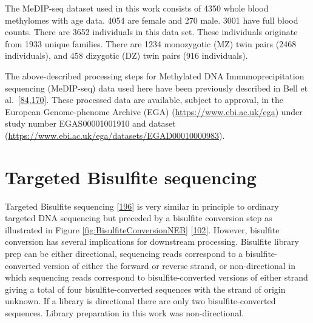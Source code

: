 \documentclass[
]{book}
\begin{document}
The MeDIP-seq dataset used in this work consists of 4350 whole blood methylomes with age data.
4054 are female and 270 male.
3001 have full blood counts.
There are 3652 individuals in this data set.
These individuals originate from 1933 unique families.
There are 1234 monozygotic (MZ) twin pairs (2468 individuals), and 458 dizygotic (DZ) twin pairs (916 individuals).

The above-described processing steps for Methylated DNA Immunoprecipitation sequencing (MeDIP-seq) data used here have been previously described in Bell et al.~{[}\protect\hyperlink{ref-Bell2017a}{84},\protect\hyperlink{ref-Bell2016}{170}{]}.
These processed data are available, subject to approval, in the European Genome-phenome Archive (EGA) (\url{https://www.ebi.ac.uk/ega}) under study number EGAS00001001910 and dataset (\url{https://www.ebi.ac.uk/ega/datasets/EGAD00010000983}).

\hypertarget{targeted-bisulfite-sequencing}{%
\section{Targeted Bisulfite sequencing}\label{targeted-bisulfite-sequencing}}

Targeted Bisulfite sequencing {[}\protect\hyperlink{ref-Korbie2015}{196}{]} is very similar in principle to ordinary targeted DNA sequencing but preceded by a bisulfite conversion step as illustrated in Figure \ref{fig:BisulfiteConversionNEB} {[}\protect\hyperlink{ref-Bock2010}{102}{]}.
However, bisulfite conversion has several implications for downstream processing.
Bisulfite library prep can be either directional, sequencing reads correspond to a bisulfite-converted version of either the forward or reverse strand, or non-directional in which sequencing reads correspond to bisulfite-converted versions of either strand giving a total of four bisulfite-converted sequences with the strand of origin unknown.
If a library is directional there are only two bisulfite-converted sequences.
Library preparation in this work was non-directional.
\end{document}
